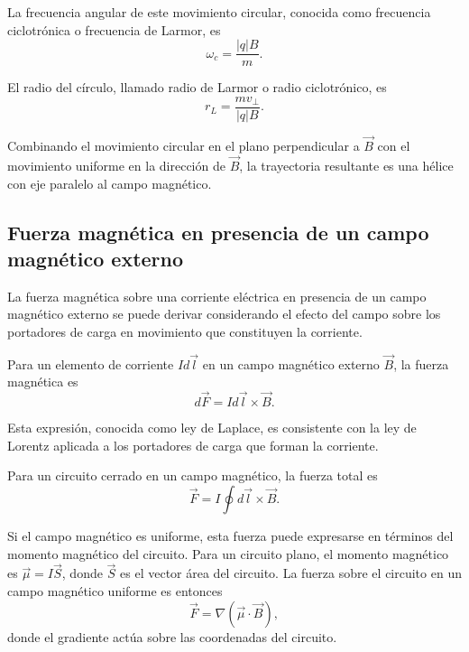 \documentclass[12pt,a4paper]{book}
\begin{document}
La frecuencia angular de este movimiento circular, conocida como frecuencia ciclotrónica o frecuencia de Larmor, es
\begin{equation}
\omega_c = \frac{|q|B}{m}.
\end{equation}

El radio del círculo, llamado radio de Larmor o radio ciclotrónico, es
\begin{equation}
r_L = \frac{mv_{\perp}}{|q|B}.
\end{equation}

Combinando el movimiento circular en el plano perpendicular a $\vec{B}$ con el movimiento uniforme en la dirección de $\vec{B}$, la trayectoria resultante es una hélice con eje paralelo al campo magnético.

\subsection{Fuerza magnética en presencia de un campo magnético externo}

La fuerza magnética sobre una corriente eléctrica en presencia de un campo magnético externo se puede derivar considerando el efecto del campo sobre los portadores de carga en movimiento que constituyen la corriente.

Para un elemento de corriente $I d\vec{l}$ en un campo magnético externo $\vec{B}$, la fuerza magnética es
\begin{equation}
d\vec{F} = I d\vec{l} \times \vec{B}.
\end{equation}

Esta expresión, conocida como ley de Laplace, es consistente con la ley de Lorentz aplicada a los portadores de carga que forman la corriente.

Para un circuito cerrado en un campo magnético, la fuerza total es
\begin{equation}
\vec{F} = I \oint d\vec{l} \times \vec{B}.
\end{equation}

Si el campo magnético es uniforme, esta fuerza puede expresarse en términos del momento magnético del circuito. Para un circuito plano, el momento magnético es $\vec{\mu} = I\vec{S}$, donde $\vec{S}$ es el vector área del circuito. La fuerza sobre el circuito en un campo magnético uniforme es entonces
\begin{equation}
\vec{F} = \nabla(\vec{\mu} \cdot \vec{B}),
\end{equation}
donde el gradiente actúa sobre las coordenadas del circuito.
\end{document}

